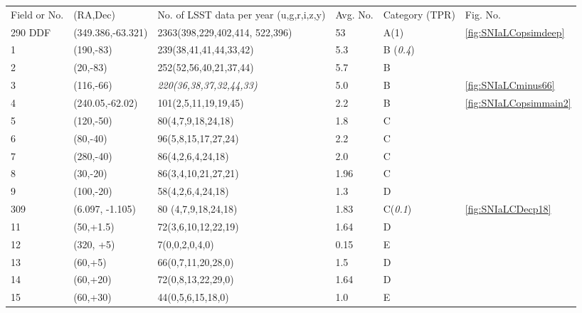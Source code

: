 \begin{center}
\begin{table}
\begin{tabular}{|p{0.7cm} |p{2.8cm}|p{4cm}|p{1.7cm}|p{1.4cm}|p{0.7cm}|}
\hline
 Field or No. & (RA,Dec) & No. of LSST data per year (u,g,r,i,z,y)       & Avg. No.&Category (TPR) &Fig. No. \\
290 DDF  & (349.386,-63.321)  & 2363(398,229,402,414, 522,396) & 53 & A(1)&\ref{fig:SNIaLCopsimdeep}  \\
 1      & (190,-83) &    239(38,41,41,44,33,42) & 5.3 & B ({\it 0.4}) & \\
 2      &(20,-83) & 252(52,56,40,21,37,44)  &5.7  & B  & \\
3      &(116,-66) &  {\it 220(36,38,37,32,44,33)} & 5.0 & B & \ref{fig:SNIaLCminus66} \\
 4      &(240.05,-62.02) &101(2,5,11,19,19,45) & 2.2  & B & \ref{fig:SNIaLCopsimmain2}\\
 5      &(120,-50)  &80(4,7,9,18,24,18)        & 1.8 &  C &\\
 6      & (80,-40)  &      96(5,8,15,17,27,24) &  2.2 & C &\\
 7      & (280,-40) &      86(4,2,6,4,24,18)   &  2.0& C &\\
 8      & (30,-20)  &      86(3,4,10,21,27,21) &  1.96& C & \\
 9      & (100,-20) &      58(4,2,6,4,24,18)   &  1.3& D &\\
 309  & (6.097, -1.105) & 80 (4,7,9,18,24,18)  & 1.83   & C({\it 0.1}) & \ref{fig:SNIaLCDecp18}\\
 11     & (50,+1.5) &      72(3,6,10,12,22,19) &  1.64& D &\\
 12     & (320, +5) &      7(0,0,2,0,4,0)      &  0.15& E &\\
 13     & (60,+5)   &      66(0,7,11,20,28,0)  &  1.5  & D& \\
 14     & (60,+20)  &      72(0,8,13,22,29,0)  &  1.64& D &\\
 15     & (60,+30)  &      44(0,5,6,15,18,0)   &  1.0& E &\\
\hline
\end{tabular}
\label{tab:lcpositions}
\end{table}
\end{center}

